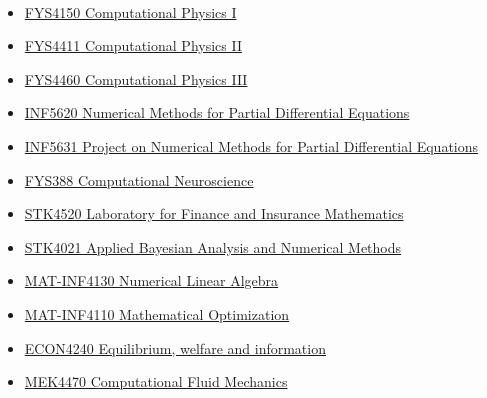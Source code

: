 \documentclass[%
oneside,                 %
final,                   %
10pt]{article}
\begin{document}
\paragraph{}

\begin{itemize}
\item \href{{http://www.uio.no/studier/emner/matnat/fys/FYS4150/index-eng.html}}{FYS4150 Computational Physics I}

\item \href{{http://www.uio.no/studier/emner/matnat/fys/FYS4411/}}{FYS4411 Computational Physics II}

\item \href{{http://www.uio.no/studier/emner/matnat/fys/FYS4460/}}{FYS4460 Computational Physics III}

\item \href{{http://www.uio.no/studier/emner/matnat/ifi/INF5620/index-eng.html}}{INF5620 Numerical Methods for Partial Differential Equations}

\item \href{{http://www.uio.no/studier/emner/matnat/ifi/INF5631/index-eng.html}}{INF5631 Project on Numerical Methods for Partial Differential Equations}

\item \href{{http://www.nmbu.no/course/FYS388}}{FYS388 Computational Neuroscience}

\item \href{{http://www.uio.no/studier/emner/matnat/math/STK4520/index-eng.html}}{STK4520 Laboratory for Finance and Insurance Mathematics}

\item \href{{http://www.uio.no/studier/emner/matnat/math/STK4021/index-eng.html}}{STK4021 Applied Bayesian Analysis and Numerical Methods}

\item \href{{http://www.uio.no/studier/emner/matnat/math/MAT-INF4130/index-eng.html}}{MAT-INF4130  Numerical Linear Algebra}

\item \href{{http://www.uio.no/studier/emner/matnat/math/MAT-INF4110/index.html}}{MAT-INF4110 Mathematical Optimization}

\item \href{{http://www.uio.no/studier/emner/sv/oekonomi/ECON4240/index.html}}{ECON4240 Equilibrium, welfare and information}

\item \href{{http://www.uio.no/studier/emner/matnat/math/MEK4470/index-eng.html}}{MEK4470  Computational Fluid Mechanics}


\end{itemize}
\end{document}
